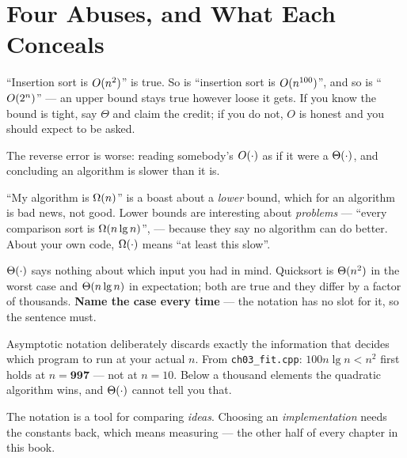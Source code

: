 \section{Four Abuses, and What Each Conceals}

\begin{alertbox}
``Insertion sort is $O(n^{2})$'' is true. So is ``insertion sort is
$O(n^{100})$'', and so is ``$O(2^{n})$'' --- an upper bound stays true
however loose it gets. If you know the bound is tight, say $\Theta$ and claim
the credit; if you do not, $O$ is honest and you should expect to be asked.

\smallskip
The reverse error is worse: reading somebody's $O(\cdot)$ as if it were a
$\Theta(\cdot)$, and concluding an algorithm is slower than it is.
\end{alertbox}

\begin{alertbox}
``My algorithm is $\Omega(n)$'' is a boast about a \emph{lower} bound, which
for an algorithm is bad news, not good. Lower bounds are interesting about
\emph{problems} --- ``every comparison sort is $\Omega(n\operatorname{lg} n)$'',
 --- because they say no algorithm can do better. About your
own code, $\Omega(\cdot)$ means ``at least this slow''.
\end{alertbox}

\begin{alertbox}
$\Theta(\cdot)$ says nothing about which input you had in mind. Quicksort is
$\Theta(n^{2})$ in the worst case and $\Theta(n \operatorname{lg} n)$ in expectation; both
are true and they differ by a factor of thousands. \textbf{Name the case every
time} --- the notation has no slot for it, so the sentence must.
\end{alertbox}

\begin{alertbox}
Asymptotic notation deliberately discards exactly the information that decides
which program to run at your actual $n$. From \texttt{ch03\_fit.cpp}:
$100n\lg n < n^{2}$ first holds at $n = \mathbf{997}$ --- not at $n = 10$.
Below a thousand elements the quadratic algorithm wins, and $\Theta(\cdot)$
cannot tell you that.

\smallskip
The notation is a tool for comparing \emph{ideas}. Choosing an
\emph{implementation} needs the constants back, which means measuring --- the
other half of every chapter in this book.
\end{alertbox}


